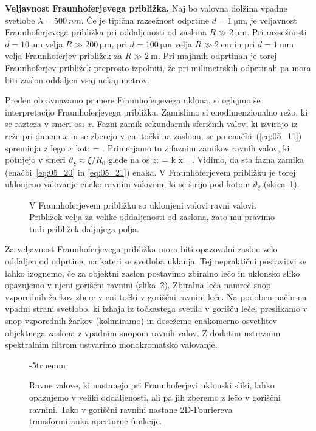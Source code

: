 \begin{example}{\bf Veljavnost Fraunhoferjevega približka.}
\label{ex:fh}
Naj bo valovna dolžina vpadne svetlobe $\lambda=500~\si{nm}$. Če je tipična 
razsežnost odprtine $d = 1~\si{\micro\metre}$, je veljavnost 
Fraunhoferjevega približka pri oddaljenosti od zaslona 
$R\gg 2~\si{\micro\metre}$. Pri razsežnosti
$d = 10~\si{\micro\metre}$ velja $R\gg 200~\si{\micro\metre}$, 
pri $d = 100~\si{\micro\metre}$ velja $R\gg 2~\si{\centi\metre}$ in 
pri $d = 1~\si{\milli\metre}$ velja Fraunhoferjev približek za
$R\gg 2~\si{\metre}$. Pri majhnih odprtinah je torej Fraunhoferjev približek
preprosto izpolniti, že pri milimetrskih odprtinah
pa mora biti zaslon oddaljen vsaj nekaj metrov. 
\end{example}

Preden obravnavamo primere Fraunhoferjevega uklona, si oglejmo še interpretacijo 
Fraunhoferjevega približka. Zamislimo si enodimenzionalno režo, ki se razteza v smeri 
osi $x$. Fazni zamik sekundarnih sferičnih valov, ki izvirajo iz reže pri danem $x$ 
in se zberejo v eni točki na zaslonu, se po enačbi~(\ref{eq:05_11}) spreminja z lego $x$ kot:
\beq
\Delta \phi = .
\label{eq:05_20}
\eeq
Primerjamo to z faznim zamikov ravnih valov, ki potujejo v smeri $\vartheta_\xi \approx
\xi/R_0$ glede na os $z$:
\beq
\Delta \phi = k x \vartheta_\xi.
\label{eq:05_21}
\eeq
Vidimo, da sta fazna zamika (enačbi~\ref{eq:05_20} in \ref{eq:05_21}) enaka. 
V Fraunhoferjevem približku je torej uklonjeno valovanje
enako ravnim valovom, ki se širijo pod kotom $\vartheta_\xi$ 
(skica~\ref{fig:05_ravnivalovi}).
\begin{figure}[h]
\centering
\def\svgwidth{75truemm} 

\caption{V Fraunhoferjevem približku so uklonjeni valovi ravni valovi. Približek
velja za velike oddaljenosti od zaslona, zato mu pravimo tudi približek
daljnjega polja.}
\label{fig:05_ravnivalovi}
\end{figure}

Za veljavnost Fraunhoferjevega približka mora biti opazovalni zaslon zelo
oddaljen od odprtine, na kateri se svetloba uklanja. Tej nepraktični 
postavitvi se lahko izognemo, če za objektni zaslon postavimo zbiralno 
lečo in uklonsko sliko opazujemo v njeni goriščni ravnini (slika~\ref{fig:05_2DFourier}). 
Zbiralna leča namreč snop vzporednih žarkov zbere v eni 
točki v goriščni ravnini leče. Na podoben način na vpadni strani svetlobo, ki 
izhaja iz točkastega svetila v gorišču leče, preslikamo v snop vzporednih žarkov (kolimiramo)
in dosežemo enakomerno osvetlitev
objektnega zaslona z vpadnim snopom ravnih valov.
Z dodatim ustreznim spektralnim filtrom ustvarimo 
monokromatsko valovanje.
\begin{figure}[ht]
\centering
\def\svgwidth{80truemm} 

\caption{Ravne valove, ki nastanejo pri Fraunhoferjevi uklonski sliki, lahko opazujemo v
veliki oddaljenosti, ali pa jih zberemo z lečo v goriščni ravnini. Tako v goriščni
ravnini nastane 2D-Fouriereva transformiranka aperturne funkcije.}
\label{fig:05_2DFourier}
\vglue-5truemm
\end{figure}

